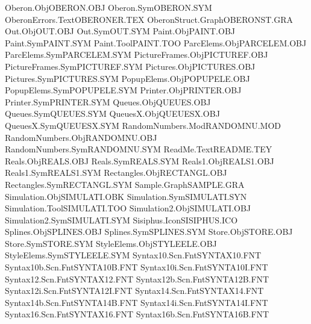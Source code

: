 Oberon.Obj                      OBERON.OBJ   
Oberon.Sym                      OBERON.SYM   
OberonErrors.Text               OBERONER.TEX 
OberonStruct.Graph              OBERONST.GRA 
Out.Obj                         OUT.OBJ      
Out.Sym                         OUT.SYM      
Paint.Obj                       PAINT.OBJ    
Paint.Sym                       PAINT.SYM    
Paint.Tool                      PAINT.TOO    
ParcElems.Obj                   PARCELEM.OBJ 
ParcElems.Sym                   PARCELEM.SYM 
PictureFrames.Obj               PICTUREF.OBJ 
PictureFrames.Sym               PICTUREF.SYM 
Pictures.Obj                    PICTURES.OBJ 
Pictures.Sym                    PICTURES.SYM 
PopupElems.Obj                  POPUPELE.OBJ 
PopupElems.Sym                  POPUPELE.SYM 
Printer.Obj                     PRINTER.OBJ  
Printer.Sym                     PRINTER.SYM  
Queues.Obj                      QUEUES.OBJ   
Queues.Sym                      QUEUES.SYM   
QueuesX.Obj                     QUEUESX.OBJ  
QueuesX.Sym                     QUEUESX.SYM  
RandomNumbers.Mod               RANDOMNU.MOD 
RandomNumbers.Obj               RANDOMNU.OBJ 
RandomNumbers.Sym               RANDOMNU.SYM 
ReadMe.Text                     README.TEY   
Reals.Obj                       REALS.OBJ    
Reals.Sym                       REALS.SYM    
Reals1.Obj                      REALS1.OBJ   
Reals1.Sym                      REALS1.SYM   
Rectangles.Obj                  RECTANGL.OBJ 
Rectangles.Sym                  RECTANGL.SYM 
Sample.Graph                    SAMPLE.GRA   
Simulation.Obj                  SIMULATI.OBK 
Simulation.Sym                  SIMULATI.SYN 
Simulation.Tool                 SIMULATI.TOO 
Simulation2.Obj                 SIMULATI.OBJ 
Simulation2.Sym                 SIMULATI.SYM 
Sisiphus.Icon                   SISIPHUS.ICO 
Splines.Obj                     SPLINES.OBJ  
Splines.Sym                     SPLINES.SYM  
Store.Obj                       STORE.OBJ    
Store.Sym                       STORE.SYM    
StyleElems.Obj                  STYLEELE.OBJ 
StyleElems.Sym                  STYLEELE.SYM 
Syntax10.Scn.Fnt                SYNTAX10.FNT 
Syntax10b.Scn.Fnt               SYNTA10B.FNT 
Syntax10i.Scn.Fnt               SYNTA10I.FNT 
Syntax12.Scn.Fnt                SYNTAX12.FNT 
Syntax12b.Scn.Fnt               SYNTA12B.FNT 
Syntax12i.Scn.Fnt               SYNTA12I.FNT 
Syntax14.Scn.Fnt                SYNTAX14.FNT 
Syntax14b.Scn.Fnt               SYNTA14B.FNT 
Syntax14i.Scn.Fnt               SYNTA14I.FNT 
Syntax16.Scn.Fnt                SYNTAX16.FNT 
Syntax16b.Scn.Fnt               SYNTA16B.FNT 
